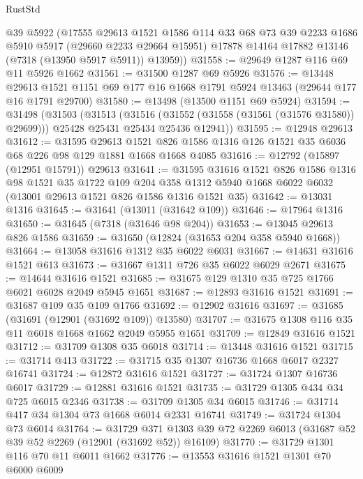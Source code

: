\begin{lexlean}{RustStd}
\begin{coremodule}
      @39
      @5922
      (@17555
        @29613
        @1521
        @1586
        @114
        @33
        @68
        @73
        @39
        @2233
        @1686
        @5910
        @5917
        (@29660 @2233 @29664 @15951)
        @17878
        @14164
        @17882
        @13146
        (@7318 (@13950 @5917 @5911))
        @13959))
@31558 := @29649 @1287 @116 @69 @11 @5926 @1662
@31561 := @31500 @1287 @69 @5926
@31576 := @13448
    @29613
    @1521
    @1151
    @69
    @177
    @16
    @1668
    @1791
    @5924
    @13463
    (@29644 @177 @16 @1791 @29700)
@31580 := @13498 (@13500 @1151 @69 @5924)
@31594 := @31498
    (@31503
      (@31513
        (@31516 (@31552 (@31558 (@31561 (@31576 @31580)) @29699)))
        @25428
        @25431
        @25434
        @25436
        @12941))
@31595 := @12948 @29613
@31612 := @31595
    @29613
    @1521
    @826
    @1586
    @1316
    @126
    @1521
    @35
    @6036
    @68
    @226
    @98
    @129
    @1881
    @1668
    @1668
    @4085
@31616 := @12792 (@15897 (@12951 @15791)) @29613
@31641 := @31595
    @31616
    @1521
    @826
    @1586
    @1316
    @98
    @1521
    @35
    @1722
    @109
    @204
    @358
    @1312
    @5940
    @1668
    @6022
    @6032
    (@13001 @29613 @1521 @826 @1586 @1316 @1521 @35)
@31642 := @13031 @1316
@31645 := @31641 (@13011 (@31642 @109))
@31646 := @17964 @1316
@31650 := @31645 (@7318 (@31646 @98 @204))
@31653 := @13045 @29613 @826 @1586
@31659 := @31650 (@12824 (@31653 @204 @358 @5940 @1668))
@31664 := @13058 @31616 @1312 @35 @6022 @6031
@31667 := @14631 @31616 @1521 @613
@31673 := @31667 @1311 @726 @35 @6022 @6029 @2671
@31675 := @14644 @31616 @1521
@31685 := @31675 @129 @1310 @35 @725 @1766 @6021 @6028 @2049 @5945 @1651
@31687 := @12893 @31616 @1521
@31691 := @31687 @109 @35 @109 @1766
@31692 := @12902 @31616
@31697 := @31685 (@31691 (@12901 (@31692 @109)) @13580)
@31707 := @31675 @1308 @116 @35 @11 @6018 @1668 @1662 @2049 @5955 @1651
@31709 := @12849 @31616 @1521
@31712 := @31709 @1308 @35 @6018
@31714 := @13448 @31616 @1521
@31715 := @31714 @413
@31722 := @31715 @35 @1307 @16736 @1668 @6017 @2327 @16741
@31724 := @12872 @31616 @1521
@31727 := @31724 @1307 @16736 @6017
@31729 := @12881 @31616 @1521
@31735 := @31729 @1305 @434 @34 @725 @6015 @2346
@31738 := @31709 @1305 @34 @6015
@31746 := @31714 @417 @34 @1304 @73 @1668 @6014 @2331 @16741
@31749 := @31724 @1304 @73 @6014
@31764 := @31729
    @371
    @1303
    @39
    @72
    @2269
    @6013
    (@31687 @52 @39 @52 @2269 (@12901 (@31692 @52)) @16109)
@31770 := @31729 @1301 @116 @70 @11 @6011 @1662
@31776 := @13553 @31616 @1521 @1301 @70 @6000 @6009

\end{coremodule}
\end{lexlean}
